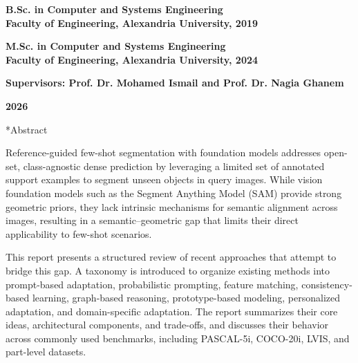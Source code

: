 \documentclass[journal,12pt,onecolumn,draftclsnofoot]{IEEEtran}
\makeatletter
\newcounter{chapter}
\renewcommand{\thechapter}{\arabic{chapter}}
\newcommand{\my@chapter}[1]{%
    \cleardoublepage 
    \par\vspace*{4ex}%
    \refstepcounter{chapter}%
    \setcounter{section}{0}%
    \setcounter{figure}{0}%
    \setcounter{table}{0}%
    \setcounter{equation}{0}%
    \addcontentsline{toc}{chapter}{\protect\numberline{\thechapter}#1}%
    \addtocontents{lof}{\protect\addvspace{10\p@}}%
    \addtocontents{lot}{\protect\addvspace{10\p@}}%
    {\noindent\normalfont\Huge\bfseries Chapter \thechapter \par\vspace{2ex}\noindent\huge #1\par}%
    \@afterheading
    \vspace*{4ex}%
}
\newcommand{\my@schapter}[1]{%
    \cleardoublepage
    \par\vspace*{4ex}%
    {\noindent\normalfont\Huge\bfseries #1\par}%
    \@afterheading
    \vspace*{4ex}%
}
\def\chapter{\@ifstar{\my@schapter}{\my@chapter}}
\makeatother
\begin{document}
\vspace{0.1cm}

\begin{center}
    {\small \textbf{B.Sc. in Computer and Systems Engineering  \\
    Faculty of Engineering, Alexandria University, 2019}}
    
    \vspace{0.5cm}
    
    {\small \textbf{M.Sc. in Computer and Systems Engineering  \\
    Faculty of Engineering, Alexandria University, 2024}}
\end{center}

\vspace{1cm}

\begin{center}
    \textbf{Supervisors: Prof. Dr. Mohamed Ismail and Prof. Dr. Nagia Ghanem}
\end{center}

\vfill %

\begin{center}
   \textbf{2026}
\end{center}

\normalsize

\newpage



\chapter*{Abstract}
\normalsize

Reference-guided few-shot segmentation with foundation models addresses open-set, class-agnostic dense prediction by leveraging a limited set of annotated support examples to segment unseen objects in query images. While vision foundation models such as the Segment Anything Model (SAM) provide strong geometric priors, they lack intrinsic mechanisms for semantic alignment across images, resulting in a semantic--geometric gap that limits their direct applicability to few-shot scenarios.  

This report presents a structured review of recent approaches that attempt to bridge this gap. A taxonomy is introduced to organize existing methods into prompt-based adaptation, probabilistic prompting, feature matching, consistency-based learning, graph-based reasoning, prototype-based modeling, personalized adaptation, and domain-specific adaptation. The report summarizes their core ideas, architectural components, and trade-offs, and discusses their behavior across commonly used benchmarks, including PASCAL-5i, COCO-20i, LVIS, and part-level datasets.  
\end{document}
